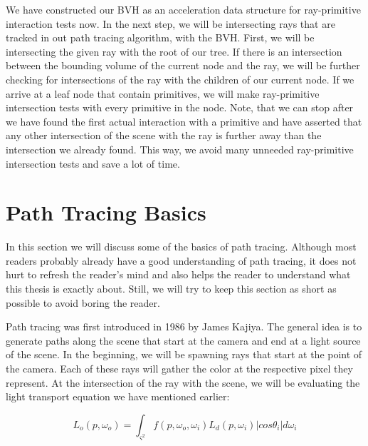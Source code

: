 We have constructed our BVH as an acceleration data structure for ray-primitive interaction tests now. In the next step, we will be intersecting rays that are tracked in out path tracing algorithm, with the BVH. First, we will be intersecting the given ray with the root of our tree. If there is an intersection between the bounding volume of the current node and the ray, we will be further checking for intersections of the ray with the children of our current node. If we arrive at a leaf node that contain primitives, we will make ray-primitive intersection tests with every primitive in the node. Note, that we can stop after we have found the first actual interaction with a primitive and have asserted that any other intersection of the scene with the ray is further away than the intersection we already found.  This way, we avoid many unneeded ray-primitive intersection tests 
and save a lot of time.

\section{Path Tracing Basics}
\label{sec:preliminaries:pat}

In this section we will discuss some of the basics of path tracing. Although most readers probably already have a good understanding of path tracing, it does not hurt to refresh the reader's mind and also helps the reader to understand what this thesis is exactly about. Still, we will try to keep this section as short as possible to avoid boring the reader.

Path tracing was first introduced in 1986 by James Kajiya. The general idea is to generate paths along the scene that start at the camera and end at a light source of the scene. In the beginning, we will be spawning rays that start at the point of the camera. Each of these rays will gather the color at the respective pixel they represent. At the intersection of the ray with the scene, we will be evaluating the light transport equation we have mentioned earlier:

\begin{equation}
L_o(p, \omega_o) = \int_{\varsigma^2}f(p, \omega_o, \omega_i)L_d(p, \omega_i)|cos\theta_i|d\omega_i
\end{equation}

